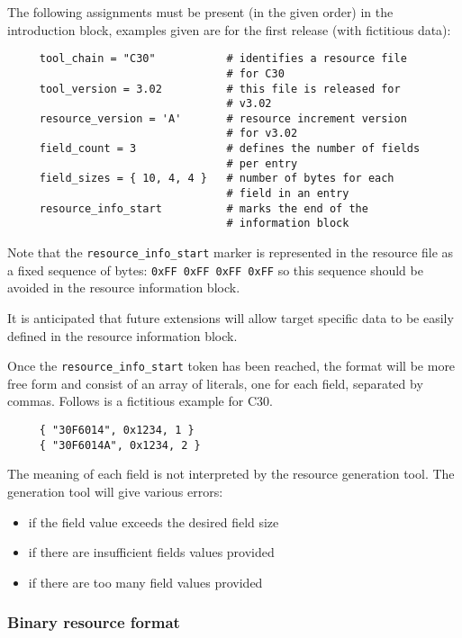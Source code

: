 \documentclass{article}
\begin{document}
  The following assignments must be present (in the given order) in the 
  introduction block, examples given are for the first release (with 
  fictitious data):
\chgbarbegin
  \begin{verbatim}
     tool_chain = "C30"           # identifies a resource file
                                  # for C30
     tool_version = 3.02          # this file is released for 
                                  # v3.02
     resource_version = 'A'       # resource increment version
                                  # for v3.02
     field_count = 3              # defines the number of fields 
                                  # per entry
     field_sizes = { 10, 4, 4 }   # number of bytes for each 
                                  # field in an entry
     resource_info_start          # marks the end of the 
                                  # information block
  \end{verbatim}

  Note that the \texttt{resource\_info\_start} marker is represented in the
  resource file as a fixed sequence of bytes: \texttt{0xFF 0xFF 0xFF 0xFF}
  so this sequence should be avoided in the resource information block.

  It is anticipated that future extensions will allow target specific data
  to be easily defined in the resource information block.
\chgbarend
  
  Once the \texttt{resource\_info\_start} token has been reached, the format
  will be more free form and consist of an array of literals, one for each
  field, separated by commas.  Follows is a fictitious example for C30.
  \begin{verbatim}
     { "30F6014", 0x1234, 1 }
     { "30F6014A", 0x1234, 2 }
  \end{verbatim}

\chgbarbegin
  The meaning of each field is not interpreted by the resource generation
  tool.  
\chgbarend
  The generation tool will give various errors: 
  \begin{itemize}
     \item if the field value exceeds the desired field size
     \item if there are insufficient fields values provided
     \item if there are too many field values provided
  \end{itemize}
  
\subsubsection{Binary resource format}
\end{document}
